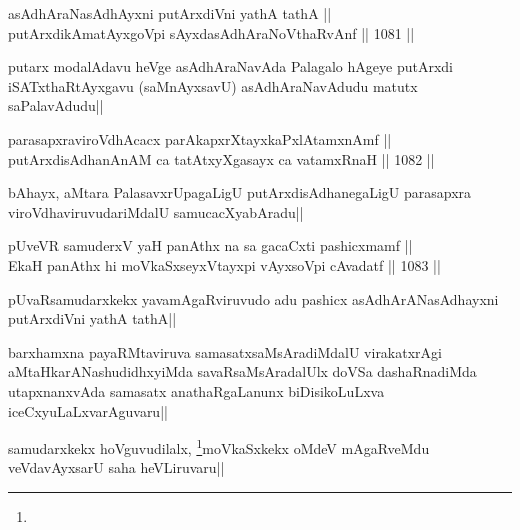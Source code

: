 \begin{shl}
asAdhAraNasAdhAyxni putArxdiVni yathA tathA || \\
putArxdikAmatAyxgoV\s pi sAyxdasAdhAraNoV\s thaRvAnf ||  1081 ||  
\end{shl}

\begin{artha}
putarx modalAdavu heVge asAdhAraNavAda Palagalo hAgeye putArxdi iSATxthaRtAyxgavu (saMnAyxsavU) asAdhAraNavAdudu matutx saPalavAdudu||
\end{artha}


\begin{shl}
parasapxraviroVdhAcacx parAkapxrXtayxkaPxlAtamxnAmf || \\
putArxdisAdhanAnAM ca tatAtxyXgasayx ca vatamxRnaH ||  1082 ||  
\end{shl}

\begin{artha}
bAhayx, aMtara PalasavxrUpagaLigU putArxdisAdhanegaLigU parasapxra viroVdhaviruvudariMdalU samucacXyabAradu||
\end{artha}


\begin{shl}
pUveVR samuderxV yaH panAthx na sa gacaCxti pashicxmamf ||  \\
EkaH panAthx hi moVkaSxseyxVtayxpi vAyxsoV\s pi cAvadatf ||  1083 ||  
\end{shl}

\begin{artha}
pUvaRsamudarxkekx yavamAgaRviruvudo adu pashicx asAdhArANasAdhayxni putArxdiVni yathA 
tathA||
\end{artha}

\begin{artha}
barxhamxna payaRMtaviruva samasatxsaMsAradiMdalU virakatxrAgi aMtaHkarANashudidhxyiMda savaRsaMsAradalUlx doVSa dashaRnadiMda utapxnanxvAda samasatx anathaRgaLanunx biDisikoLuLxva iceCxyuLaLxvarAguvaru||
\end{artha}


\begin{artha}
samudarxkekx hoVguvudilalx, \footnote{}moVkaSxkekx oMdeV mAgaRveMdu veVdavAyxsarU saha heVLiruvaru|| 
\end{artha}

